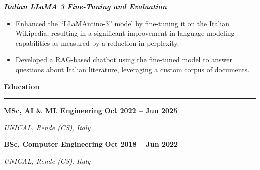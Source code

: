 \documentclass[9pt, a4paper]{article}
\newcommand{\cvsection}[1]{%
	\vspace{4pt}\par
	{\Large\bfseries\color{sectionblue}#1}\par
	\vspace{2pt}\hrule\vspace{6pt}
}
\newcommand{\cvsubsection}[3]{%
	\par {\large\bfseries #1} \hfill {\bfseries #2} \par {\textit{#3}} \vspace{4pt}
}
\newcommand{\cvproject}[1]{%
	\par {\large{\bfseries{\textit{#1}}}} \par \vspace{4pt}
}
\begin{document}
\begin{minipage}[t]{0.70\linewidth}
		\vspace{6pt}
		\cvproject{\href{https://github.com/bGuzzo/Italian-LLaMA-Project}{Italian LLaMA 3 Fine-Tuning and Evaluation}}
		\begin{itemize}[leftmargin=*, nosep]
			\item \footnotesize Enhanced the ``LLaMAntino-3'' model by fine-tuning it on the Italian Wikipedia, resulting in a significant improvement in language modeling capabilities as measured by a reduction in perplexity.
			\item \footnotesize Developed a RAG-based chatbot using the fine-tuned model to answer questions about Italian literature, leveraging a custom corpus of documents.
		\end{itemize}
		
		\vspace{10pt}\par
		\cvsection{Education}
		
		\cvsubsection{MSc, AI \& ML Engineering}{Oct 2022 -- Jun 2025}{UNICAL, Rende (CS), Italy}
		\cvsubsection{BSc, Computer Engineering}{Oct 2018 -- Jun 2022}{UNICAL, Rende (CS), Italy}
		
	\end{minipage}%
	\hfill%
\end{document}
